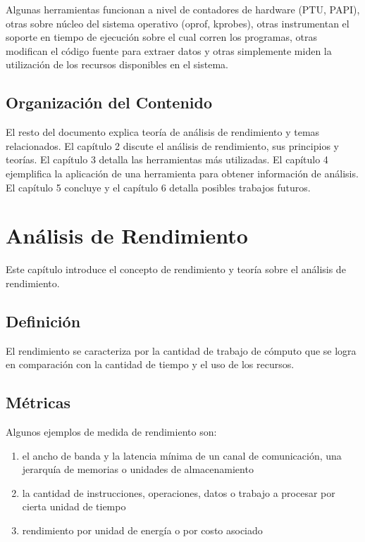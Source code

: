 \documentclass[a4paper]{report}
\begin{document}
\bigskip

Algunas herramientas funcionan a nivel de contadores de hardware (PTU, PAPI), otras sobre n\'ucleo del sistema
operativo (oprof, kprobes), otras instrumentan el soporte en tiempo de ejecuci\'on sobre el cual corren los
programas, otras modifican el c\'odigo fuente para extraer datos y otras simplemente miden la utilizaci\'on
de los recursos disponibles en el sistema.

\section{Organizaci\'on del Contenido}

El resto del documento explica teor\'ia de an\'alisis de rendimiento y temas
relacionados. El cap\'itulo 2 discute el an\'alisis de rendimiento, sus principios y teor\'ias.
El cap\'itulo 3 detalla las herramientas m\'as utilizadas. El cap\'itulo 4 ejemplifica la
aplicaci\'on de una herramienta para obtener informaci\'on de an\'alisis.
El cap\'itulo 5 concluye y el cap\'itulo 6 detalla posibles trabajos futuros.

\chapter{An\'alisis de Rendimiento}

Este cap\'itulo introduce el concepto de rendimiento y teor\'ia sobre el an\'alisis de rendimiento.

\section{Definici\'on}

El rendimiento se caracteriza por la cantidad de trabajo de c\'omputo que se logra
en comparaci\'on con la cantidad de tiempo y el uso de los recursos.

\section{M\'etricas}

Algunos ejemplos de medida de rendimiento son:

\begin{enumerate}
\item el ancho de banda y la latencia m\'inima de un canal de comunicaci\'on, una jerarqu\'ia de memorias o unidades
  de almacenamiento
\item la cantidad de instrucciones, operaciones, datos o trabajo a procesar por cierta unidad de tiempo
\item rendimiento por unidad de energ\'ia o por costo asociado
\end{enumerate}
\end{document}

